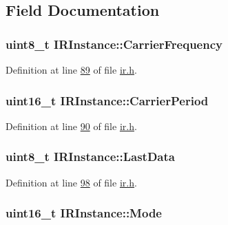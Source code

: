 \subsection{Field Documentation}
\hypertarget{struct_i_r_instance_a23a3063e6f24eaca78f9e0db2f3bd07f}{
\subsubsection[{Carrier\-Frequency}]{\setlength{\rightskip}{0pt plus 5cm}uint8\-\_\-t I\-R\-Instance\-::\-Carrier\-Frequency}}\label{struct_i_r_instance_a23a3063e6f24eaca78f9e0db2f3bd07f}


Definition at line \hyperlink{ir_8h_source_l00089}{89} of file \hyperlink{ir_8h_source}{ir.\-h}.

\hypertarget{struct_i_r_instance_a7ce4e156e8b335f4ab8da1ab95e8bb78}{
\subsubsection[{Carrier\-Period}]{\setlength{\rightskip}{0pt plus 5cm}uint16\-\_\-t I\-R\-Instance\-::\-Carrier\-Period}}\label{struct_i_r_instance_a7ce4e156e8b335f4ab8da1ab95e8bb78}


Definition at line \hyperlink{ir_8h_source_l00090}{90} of file \hyperlink{ir_8h_source}{ir.\-h}.

\hypertarget{struct_i_r_instance_a5d62b35c44888dcb86452195478269fe}{
\subsubsection[{Last\-Data}]{\setlength{\rightskip}{0pt plus 5cm}uint8\-\_\-t I\-R\-Instance\-::\-Last\-Data}}\label{struct_i_r_instance_a5d62b35c44888dcb86452195478269fe}


Definition at line \hyperlink{ir_8h_source_l00098}{98} of file \hyperlink{ir_8h_source}{ir.\-h}.

\hypertarget{struct_i_r_instance_a08ae347b1b1741d54a0e1472bebe0c41}{
\subsubsection[{Mode}]{\setlength{\rightskip}{0pt plus 5cm}uint16\-\_\-t I\-R\-Instance\-::\-Mode}}\label{struct_i_r_instance_a08ae347b1b1741d54a0e1472bebe0c41}


